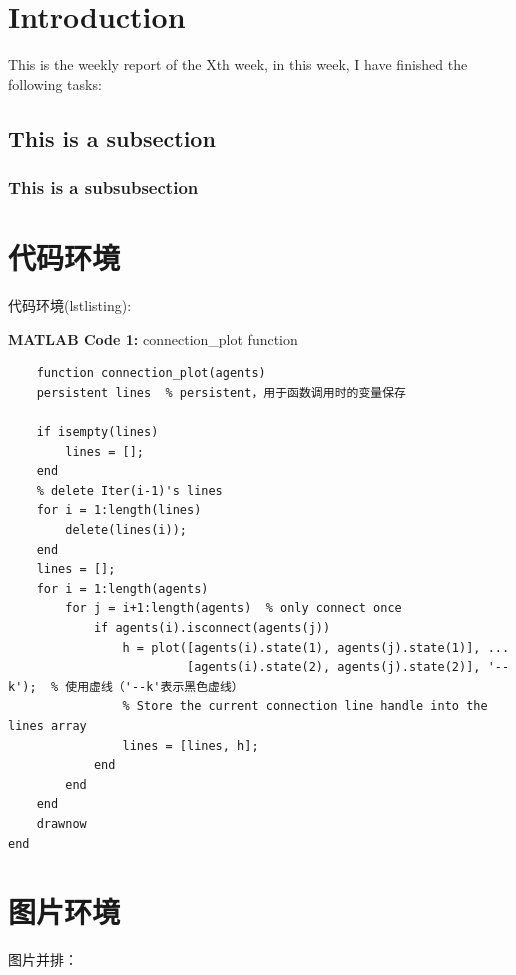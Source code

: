 \documentclass[12pt]{ctexart}
\begin{document}

\tableofcontents
\newpage
\pagestyle{fancy}
\fancyhf{}
\fancyfoot[C]{\thepage}



\maketitle

\section{Introduction}
This is the weekly report of the Xth week, in this week, I have finished the following tasks:

\subsection{This is a subsection}
\subsubsection{This is a subsubsection}

\section{代码环境}
代码环境(lstlisting):

\textbf{MATLAB Code 1:} connection\_plot function
\begin{lstlisting}
    function connection_plot(agents)
    persistent lines  % persistent，用于函数调用时的变量保存 

    if isempty(lines)
        lines = [];
    end    
    % delete Iter(i-1)'s lines
    for i = 1:length(lines)
        delete(lines(i));  
    end
    lines = [];    
    for i = 1:length(agents)
        for j = i+1:length(agents)  % only connect once
            if agents(i).isconnect(agents(j))  
                h = plot([agents(i).state(1), agents(j).state(1)], ...
                         [agents(i).state(2), agents(j).state(2)], '--k');  % 使用虚线（'--k'表示黑色虚线）
                % Store the current connection line handle into the lines array
                lines = [lines, h];
            end
        end
    end
    drawnow
end
\end{lstlisting}

\section{图片环境}
\newpage
图片并排：
\end{document}
